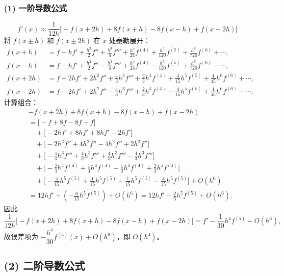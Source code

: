 \documentclass{article}
\begin{document}
\subsubsection*{(1) 一阶导数公式}
\[
f'(x) \approx \frac{1}{12h}\bigl[-f(x+2h) + 8f(x+h) - 8f(x-h) + f(x-2h)\bigr]
\]
将 \(f(x\pm h)\) 和 \(f(x\pm 2h)\) 在 \(x\) 处泰勒展开：
\[
\begin{aligned}
f(x+h) &= f + h f' + \frac{h^2}{2}f'' + \frac{h^3}{6}f''' + \frac{h^4}{24}f^{(4)} + \frac{h^5}{120}f^{(5)} + \frac{h^6}{720}f^{(6)} + \cdots,\\
f(x-h) &= f - h f' + \frac{h^2}{2}f'' - \frac{h^3}{6}f''' + \frac{h^4}{24}f^{(4)} - \frac{h^5}{120}f^{(5)} + \frac{h^6}{720}f^{(6)} - \cdots,\\
f(x+2h) &= f + 2h f' + 2h^2 f'' + \frac{4}{3}h^3 f''' + \frac{2}{3}h^4 f^{(4)} + \frac{4}{15}h^5 f^{(5)} + \frac{4}{45}h^6 f^{(6)} + \cdots,\\
f(x-2h) &= f - 2h f' + 2h^2 f'' - \frac{4}{3}h^3 f''' + \frac{2}{3}h^4 f^{(4)} - \frac{4}{15}h^5 f^{(5)} + \frac{4}{45}h^6 f^{(6)} - \cdots.
\end{aligned}
\]
计算组合：
\[
\begin{aligned}
&-f(x+2h) + 8f(x+h) - 8f(x-h) + f(x-2h) \\
&= \bigl[-f + 8f -8f + f\bigr] \\
&\quad + \bigl[-2h f' + 8h f' + 8h f' -2h f'\bigr] \\
&\quad + \bigl[-2h^2 f'' + 4h^2 f'' -4h^2 f'' + 2h^2 f''\bigr] \\
&\quad + \bigl[-\frac{4}{3}h^3 f''' + \frac{4}{3}h^3 f''' + \frac{4}{3}h^3 f''' - \frac{4}{3}h^3 f'''\bigr] \\
&\quad + \bigl[-\frac{2}{3}h^4 f^{(4)} + \frac{1}{3}h^4 f^{(4)} - \frac{1}{3}h^4 f^{(4)} + \frac{2}{3}h^4 f^{(4)}\bigr] \\
&\quad + \bigl[-\frac{4}{15}h^5 f^{(5)} + \frac{1}{15}h^5 f^{(5)} + \frac{1}{15}h^5 f^{(5)} - \frac{4}{15}h^5 f^{(5)}\bigr] + O(h^6) \\
&= 12h f' + \left(-\frac{6}{15}h^5 f^{(5)}\right) + O(h^6) = 12h f' - \frac{2}{5}h^5 f^{(5)} + O(h^6).
\end{aligned}
\]
因此
\[
\frac{1}{12h}\bigl[-f(x+2h) + 8f(x+h) - 8f(x-h) + f(x-2h)\bigr] = f' - \frac{1}{30}h^4 f^{(5)} + O(h^6),
\]
故误差项为 \(-\dfrac{h^4}{30}f^{(5)}(x)+O(h^6)\)，即 \(O(h^4)\)。

\subsection*{(2) 二阶导数公式}
\end{document}
